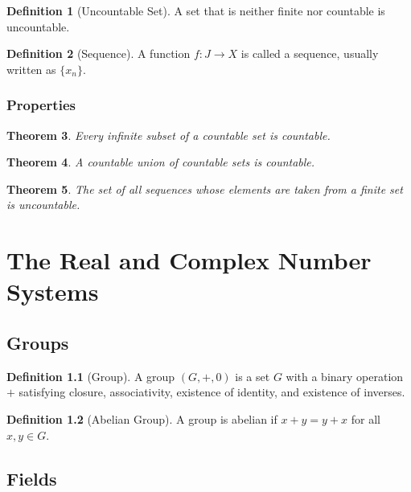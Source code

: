 \documentclass[11pt]{book}
\theoremstyle{definition}
\newtheorem{definition}{Definition}[chapter]
\theoremstyle{plain}
\newtheorem{theorem}[definition]{Theorem}
\begin{document}
\begin{definition}[Uncountable Set]
A set that is neither finite nor countable is uncountable.
\end{definition}

\begin{definition}[Sequence]
A function $f : J \to X$ is called a sequence, usually written as $\{x_n\}$.
\end{definition}

\subsection{Properties}

\begin{theorem}
Every infinite subset of a countable set is countable.
\end{theorem}

\begin{theorem}
A countable union of countable sets is countable.
\end{theorem}

\begin{theorem}
The set of all sequences whose elements are taken from a finite set is uncountable.
\end{theorem}

\chapter{The Real and Complex Number Systems}

\section{Groups}

\begin{definition}[Group]
A group $(G,+,0)$ is a set $G$ with a binary operation $+$ satisfying closure, associativity,
existence of identity, and existence of inverses.
\end{definition}

\begin{definition}[Abelian Group]
A group is abelian if $x+y=y+x$ for all $x,y \in G$.
\end{definition}

\section{Fields}
\end{document}
